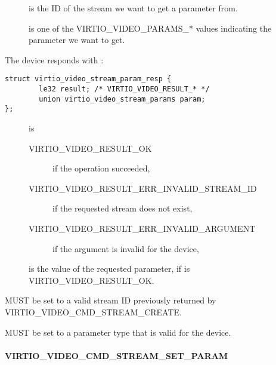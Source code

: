 \begin{description}
\item[]
is the ID of the stream we want to get a parameter from.
\item[]
is one of the VIRTIO\_VIDEO\_PARAMS\_* values indicating the parameter
we want to get.
\end{description}

The device responds with :

\begin{lstlisting}
struct virtio_video_stream_param_resp {
        le32 result; /* VIRTIO_VIDEO_RESULT_* */
        union virtio_video_stream_params param;
};
\end{lstlisting}

\begin{description}
\item[]
is

\begin{description}
\item[VIRTIO\_VIDEO\_RESULT\_OK]
if the operation succeeded,
\item[VIRTIO\_VIDEO\_RESULT\_ERR\_INVALID\_STREAM\_ID]
if the requested stream does not exist,
\item[VIRTIO\_VIDEO\_RESULT\_ERR\_INVALID\_ARGUMENT]
if the  argument is invalid for the device,
\end{description}
\item[]
is the value of the requested parameter, if  is
VIRTIO\_VIDEO\_RESULT\_OK.
\end{description}


 MUST be set to a valid stream ID previously returned
by VIRTIO\_VIDEO\_CMD\_STREAM\_CREATE.

 MUST be set to a parameter type that is valid for the
device.

\paragraph{VIRTIO_VIDEO_CMD_STREAM_SET_PARAM}\label{sec:Device Types / Video Device / Device Operation / Device Operation: Stream commands / VIRTIO_VIDEO_CMD_STREAM_SET_PARAM}

